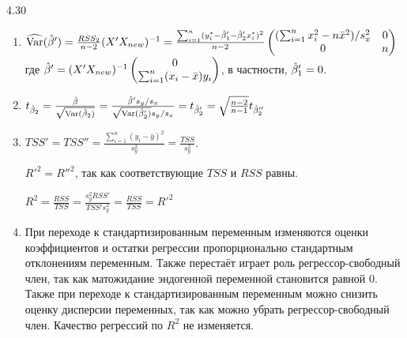 \begin{solution}{{4.30}}
\begin{enumerate}
$\hVar(\hb'_2)=\frac{RSS_2}{n-2}(X'X_{new})_{(2,2)}^{-1}=\frac{RSS_3}{n-1}(X'X_{new})_{(2,2)}^{-1}\frac{n-1}{n-2}=\hVar(\hb''_2)\frac{n-1}{n-2}$

\item $\widehat{\operatorname{Var}}(\hat{\beta}')=\frac{RSS_2}{n-2}(X'X_{new})^{-1}=\frac{\sum_{i=1}^n(y_i^*-\hat{\beta}_1'-\hat{\beta}_2'x_i^*)^2}{n-2}\begin{pmatrix}
(\sum^n_{i=1}x_i^2-n\bar x^2)/s_x^2&0\\
0&n
\end{pmatrix}$
где $\hat{\beta}'=(X'X_{new})^{-1}\begin{pmatrix}
0\\
\sum_{i=1}^n(x_i-\bar x)y_i
\end{pmatrix}$, в частности, $\hat{\beta}_1'=0$.

\item $t_{\hat{\beta}_2}=\frac{\hat\beta}{\sqrt{\operatorname{Var}(\hat{\beta}_2)}}=\frac{\hat\beta's_y/s_x}{\sqrt{\operatorname{Var}(\hat{\beta}_2')}s_y/s_x}=t_{\hat{\beta}_2'}=\sqrt{\frac{n-2}{n-1}}t_{\hat{\beta}_2''}$

\item $TSS'=TSS''=\frac{\sum_{i=1}^n(y_i-\bar y)^2}{s_y^2}=\frac{TSS}{s_y^2}$.

$R'^2=R''^2$, так как соответствующие $TSS$ и $RSS$ равны.

$R^2=\frac{RSS}{TSS}=\frac{s_y^2RSS'}{TSS's_y^2}=\frac{RSS}{TSS}=R'^2$

\item При переходе к стандартизированным переменным изменяются оценки коэффициентов и остатки регрессии пропорционально стандартным отклонениям переменным. Также перестаёт играет роль регрессор-свободный член, так как матожидание эндогенной переменной становится равной 0. Также при переходе к стандартизированным переменным можно снизить оценку дисперсии переменных, так как можно убрать регрессор-свободный член. Качество регрессий по $R^2$ не изменяется.

\end{enumerate}
\end{solution}
\protect \hypertarget {soln:4.31}{}
